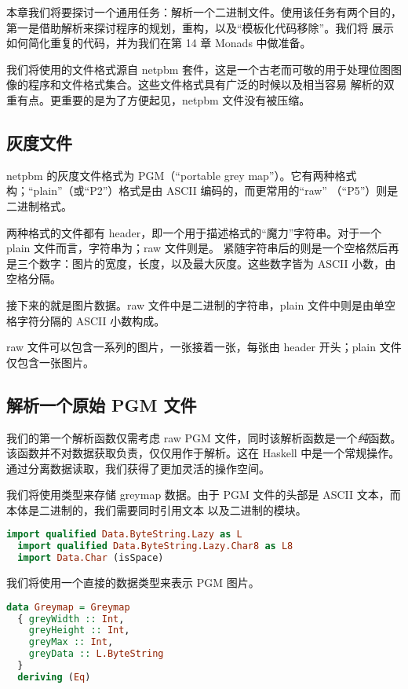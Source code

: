 \documentclass[./main.tex]{subfiles}
\begin{document}
本章我们将要探讨一个通用任务：解析一个二进制文件。使用该任务有两个目的，第一是借助解析来探讨程序的规划，重构，以及“模板化代码移除”。我们将
展示如何简化重复的代码，并为我们在第 14 章 Monads 中做准备。

我们将使用的文件格式源自 netpbm 套件，这是一个古老而可敬的用于处理位图图像的程序和文件格式集合。这些文件格式具有广泛的时候以及相当容易
解析的双重有点。更重要的是为了方便起见，netpbm 文件没有被压缩。

\subsection*{灰度文件}

netpbm 的灰度文件格式为 PGM（“portable grey map”）。它有两种格式构；“plain”（或“P2”）格式是由 ASCII 编码的，而更常用的“raw”
（“P5”）则是二进制格式。

两种格式的文件都有 header，即一个用于描述格式的“魔力”字符串。对于一个 plain 文件而言，字符串为；raw 文件则是。
紧随字符串后的则是一个空格然后再是三个数字：图片的宽度，长度，以及最大灰度。这些数字皆为 ASCII 小数，由空格分隔。

接下来的就是图片数据。raw 文件中是二进制的字符串，plain 文件中则是由单空格字符分隔的 ASCII 小数构成。

raw 文件可以包含一系列的图片，一张接着一张，每张由 header 开头；plain 文件仅包含一张图片。

\subsection*{解析一个原始 PGM 文件}

我们的第一个解析函数仅需考虑 raw PGM 文件，同时该解析函数是一个\textit{纯}函数。该函数并不对数据获取负责，仅仅用作于解析。这在
Haskell 中是一个常规操作。通过分离数据读取，我们获得了更加灵活的操作空间。

我们将使用类型来存储 greymap 数据。由于 PGM 文件的头部是 ASCII 文本，而本体是二进制的，我们需要同时引用文本
以及二进制的模块。

\begin{lstlisting}[language=Haskell]
  import qualified Data.ByteString.Lazy as L
  import qualified Data.ByteString.Lazy.Char8 as L8
  import Data.Char (isSpace)
\end{lstlisting}

我们将使用一个直接的数据类型来表示 PGM 图片。

\begin{lstlisting}[language=Haskell]
  data Greymap = Greymap
  { greyWidth :: Int,
    greyHeight :: Int,
    greyMax :: Int,
    greyData :: L.ByteString
  }
  deriving (Eq)
\end{lstlisting}
\end{document}
